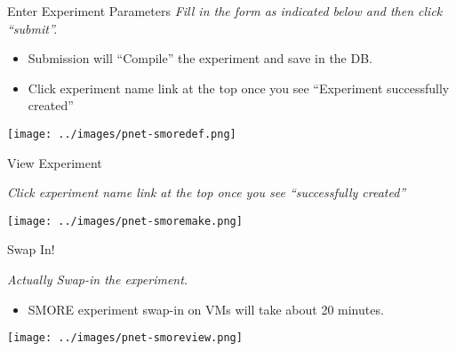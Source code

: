 \documentclass[xcolor=pdftex,dvipsnames,table]{beamer}
\begin{document}
\begin{frame}{Enter Experiment Parameters}
  \emph{Fill in the form as indicated below and then click ``submit''.}
  \vspace{0.1in}
  \begin{itemize}
    \item Submission will ``Compile'' the experiment and save in the DB.
    \item Click experiment name link at the top once you see ``Experiment successfully created''
  \end{itemize}
  \centerline{\texttt{[image: ../images/pnet-smoredef.png]}}
\end{frame}

\begin{frame}{View Experiment}
  \centerline{\emph{\small Click experiment name link at the top once you see ``successfully created''}}
  \vspace{0.1in}
  \centerline{\texttt{[image: ../images/pnet-smoremake.png]}}
\end{frame}

\begin{frame}{Swap In!}
  \centerline{\emph{Actually Swap-in the experiment.}}
  \vspace{0.1in}
  \begin{itemize}
  \item SMORE experiment swap-in on VMs will take about 20 minutes.
  \end{itemize}
  \centerline{\texttt{[image: ../images/pnet-smoreview.png]}}
\end{frame}
\end{document}
